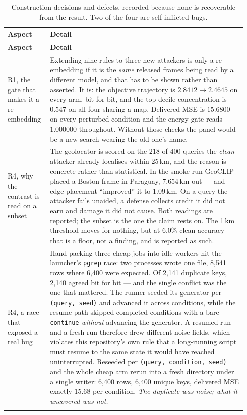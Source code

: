 \documentclass[11pt]{article}
\begin{document}
\begin{longtable}{@{}p{0.16\linewidth}p{0.78\linewidth}@{}}
\caption{Construction decisions and defects, recorded because none is
recoverable from the result. Two of the four are self-inflicted bugs.}
\label{tab:tifs14-built}\\
\toprule
\textbf{Aspect} & \textbf{Detail} \\
\midrule
\endfirsthead
\toprule
\textbf{Aspect} & \textbf{Detail} \\
\midrule
\endhead

R1, the gate that
makes it a re-embedding &
Extending nine rules to three new attackers is only a re-embedding if it is
the \emph{same} released frames being read by a different model, and that has
to be shown rather than asserted. It is: the objective trajectory is
$2.8412\to2.4645$ on every arm, bit for bit, and the top-decile concentration
is $0.547$ on all four sharing a map. Delivered MSE is $15.6800$ on every
perturbed condition and the energy gate reads $1.000000$ throughout. Without
those checks the panel would be a new search wearing the old one's name. \\
\addlinespace

R4, why the
contrast is read on a subset &
The geolocator is scored on the 218 of 400 queries the \emph{clean} attacker
already localises within 25\,km, and the reason is concrete rather than
statistical. In the smoke run GeoCLIP placed a Boston frame in Paraguay, 7{,}654\,km
out --- and edge placement ``improved'' it to 1.09\,km. On a query the attacker
fails unaided, a defense collects credit it did not earn and damage it did not
cause. Both readings are reported; the subset is the one the claim rests on.
The 1\,km threshold moves for nothing, but at $6.0\%$ clean accuracy that is a
floor, not a finding, and is reported as such. \\
\addlinespace

R4, a race that
exposed a real bug &
Hand-packing three cheap jobs into idle workers hit the launcher's
\texttt{pgrep} race: two processes wrote one file, 8{,}541 rows where 6{,}400
were expected. Of 2{,}141 duplicate keys, 2{,}140 agreed bit for bit --- and
the single conflict was the one that mattered. The runner seeded its generator
per \texttt{(query, seed)} and advanced it across conditions, while the resume
path skipped completed conditions with a bare \texttt{continue} \emph{without}
advancing the generator. A resumed run and a fresh run therefore drew
different noise fields, which violates this repository's own rule that a
long-running script must resume to the same state it would have reached
uninterrupted. Reseeded per \texttt{(query, condition, seed)} and the whole
cheap arm rerun into a fresh directory under a single writer: 6{,}400 rows,
6{,}400 unique keys, delivered MSE exactly $15.68$ per condition. \emph{The
duplicate was noise; what it uncovered was not.} \\
\addlinespace


\end{longtable}
\end{document}
